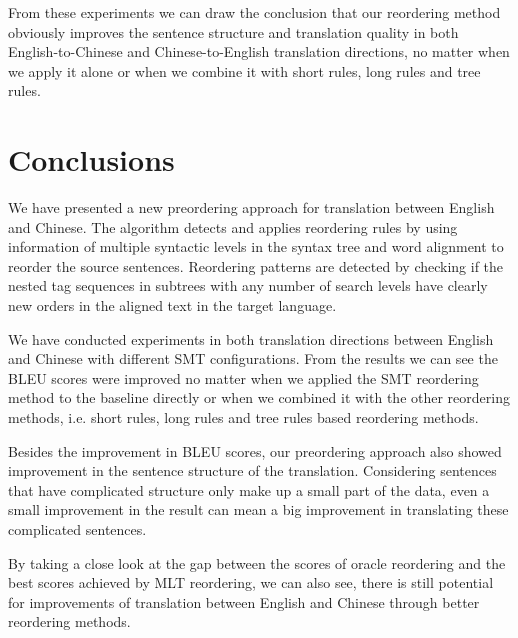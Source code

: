 \documentclass[a4paper]{article}
\begin{document}
From these experiments we can draw the conclusion that our reordering method obviously improves the sentence structure and  translation quality in both English-to-Chinese and Chinese-to-English translation directions, no matter when we apply it alone or when we combine it with short rules, long rules and tree rules. 

\section{Conclusions}
\label{co}

We have presented a new preordering approach for translation
between English and Chinese. The algorithm detects and applies reordering rules by using information of multiple syntactic levels in the syntax tree and word alignment to reorder the source sentences. Reordering patterns are detected by checking if the nested tag sequences in subtrees with any number of search levels have clearly new orders in the aligned text in the target language.

We have conducted experiments in both translation directions between English and Chinese with different SMT configurations. From the results we can see the BLEU scores were improved no matter when we applied the SMT reordering method to the baseline directly or when we combined it with the other reordering methods, i.e. short rules, long rules and tree rules based reordering methods.



Besides the improvement in BLEU scores, our preordering approach also showed improvement in the sentence structure of the translation. Considering sentences that have complicated structure only make up a small part of the data, even a small improvement in the result can mean a big improvement in translating these complicated sentences.

By taking a close look at the gap between the scores of oracle reordering and the best scores achieved by MLT reordering, we can also see, there is still potential for improvements of translation between English and Chinese through better reordering methods.
\end{document}
